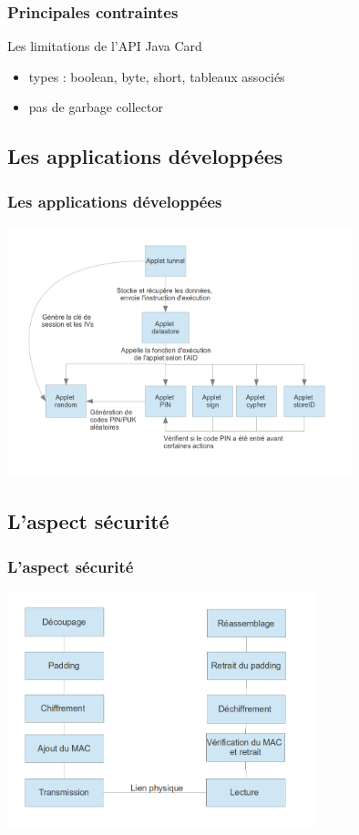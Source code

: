 \documentclass{beamer}
\begin{document}
\begin{frame}
    \frametitle{Principales contraintes}
    \begin{block}{Les limitations de l'API Java Card}
        \begin{itemize}
            \item types : boolean, byte, short, tableaux associés
            \item pas de \og garbage collector \fg{}
        \end{itemize}
    \end{block}
\end{frame}

\subsection{Les applications développées}
\begin{frame}
    \frametitle{Les applications développées}
    \includegraphics[width=10cm]{graphe_dep}
    \begin{block}{}
    \end{block}
\end{frame}

\subsection{L'aspect sécurité}
\begin{frame}
    \frametitle{L'aspect sécurité}
    \includegraphics[width=9cm]{stack}
\end{frame}
\end{document}
